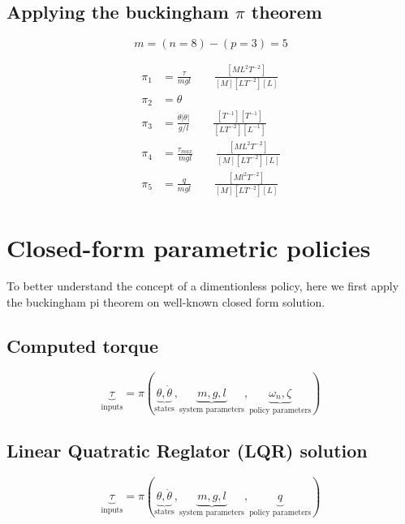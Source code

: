 \subsection{Applying the buckingham $\pi$ theorem}

\begin{equation}
m = (n = 8 ) - ( p = 3 ) = 5
\end{equation}

\begin{align}
\pi_1 &= \frac{\tau}{mgl} \quad \quad \frac{[ML^2T^{-2}]}{[M][LT^{-2}][L]} \\
\pi_2 &= \theta \quad \quad \\
\pi_3 &= \frac{ \dot{\theta} \lvert \dot{\theta} \rvert }{g/l} \quad \quad \frac{[T^{-1}][T^{-1}]}{[LT^{-2}][L^{-1}]} \\
\pi_4 &= \frac{\tau_{max}}{mgl} \quad \quad \frac{[ML^2T^{-2}]}{[M][LT^{-2}][L]} \\
\pi_5 &= \frac{q}{mgl} \quad \quad \frac{[Ml^2T^{-2}]}{[M][LT^{-2}][L]} 
\end{align}


\newpage
\section{Closed-form parametric policies}

To better understand the concept of a dimentionless policy, here we first apply the buckingham pi theorem on well-known closed form solution.

\subsection{Computed torque}

\begin{equation}
\underbrace{\tau}_{\text{inputs}}
=
\pi \left(
\underbrace{ \theta, \dot{\theta} }_{\text{states}},
\underbrace{ m , g , l }_{\text{system parameters}},
\underbrace{ \omega_n , \zeta }_{\text{policy parameters}}
\right)
\end{equation}

\subsection{Linear Quatratic Reglator (LQR) solution}


\begin{equation}
\underbrace{\tau}_{\text{inputs}}
=
\pi \left(
\underbrace{ \theta, \dot{\theta} }_{\text{states}},
\underbrace{ m , g , l }_{\text{system parameters}},
\underbrace{ q }_{\text{policy parameters}}
\right)
\end{equation}


